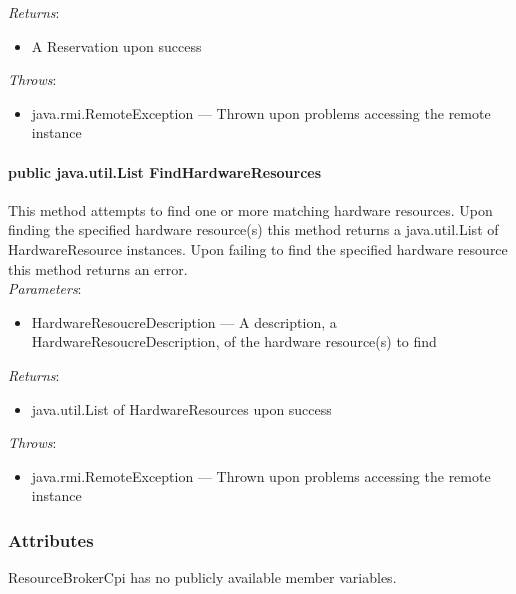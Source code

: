 \documentclass[$Date: 2003/06/26 19:29:31 $]{glabarticle}
\begin{document}
\textit{Returns}:
\begin{itemize}
\item[] A Reservation upon success 
\end{itemize}

 \textit{Throws}:
 \begin{itemize}
 \item[] java.rmi.RemoteException --- Thrown upon problems accessing the remote instance 
 \end{itemize}

\paragraph{public java.util.List FindHardwareResources}

This method attempts to find one or more matching hardware
resources. Upon finding the specified hardware resource(s) this method
returns a java.util.List of HardwareResource instances. Upon failing to find the
specified hardware resource this method returns an error. \\

\textit{Parameters}:
\begin{itemize}
\item[] HardwareResoucreDescription --- A description, a  HardwareResoucreDescription, of the hardware
  resource(s) to find
\end{itemize}

\textit{Returns}:
\begin{itemize}
\item[] java.util.List of HardwareResources upon success
\end{itemize}

 \textit{Throws}:
 \begin{itemize}
 \item[] java.rmi.RemoteException --- Thrown upon problems accessing the remote instance 
 \end{itemize}


\subsubsection{Attributes}

ResourceBrokerCpi has no publicly available member variables.

\end{document}
